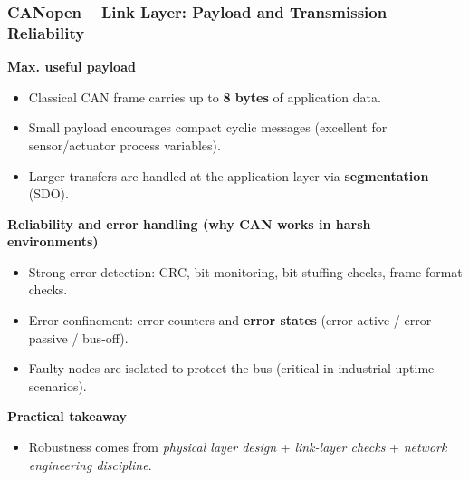 \begin{frame}
	\frametitle{CANopen -- Link Layer: Payload and Transmission Reliability}
	\small
	\textbf{Max. useful payload}
	\begin{itemize}
		\item Classical CAN frame carries up to \textbf{8 bytes} of application data.
		\item Small payload encourages compact cyclic messages (excellent for sensor/actuator process variables).
		\item Larger transfers are handled at the application layer via \textbf{segmentation} (SDO).
	\end{itemize}
	\textbf{Reliability and error handling (why CAN works in harsh environments)}
	\begin{itemize}
		\item Strong error detection: CRC, bit monitoring, bit stuffing checks, frame format checks.
		\item Error confinement: error counters and \textbf{error states} (error-active / error-passive / bus-off).
		\item Faulty nodes are isolated to protect the bus (critical in industrial uptime scenarios).
	\end{itemize}
	\textbf{Practical takeaway}
	\begin{itemize}
		\item Robustness comes from \emph{physical layer design} + \emph{link-layer checks} + \emph{network engineering discipline}.
	\end{itemize}
\end{frame}

